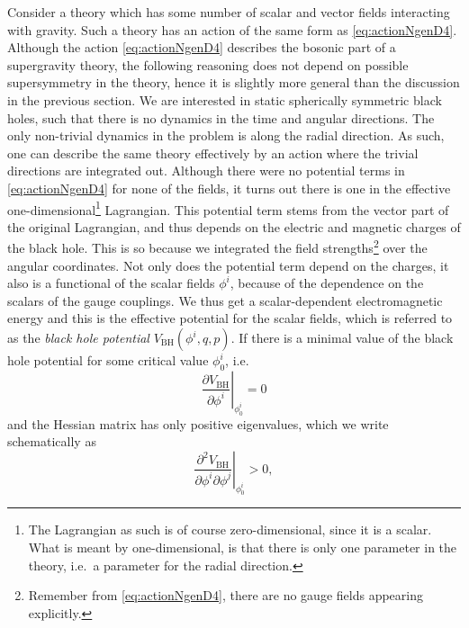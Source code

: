 \documentclass[12pt,twoside]{book}
\begin{document}
Consider a theory which has some number of scalar and vector fields interacting with gravity. Such a theory has an action of the same form as \eqref{eq:actionNgenD4}. Although the action \eqref{eq:actionNgenD4} describes the bosonic part of a supergravity theory, the following reasoning does not depend on possible supersymmetry in the theory, hence it is slightly more general than the discussion in the previous section. We are interested in static spherically symmetric black holes, such that there is no dynamics in the time and angular directions. The only non-trivial dynamics in the problem is along the radial direction. As such, one can describe the same theory effectively by an action where the trivial directions are integrated out. Although there were no potential terms in \eqref{eq:actionNgenD4} for none of the fields, it turns out there is one in the effective one-dimensional\footnote{The Lagrangian as such is of course zero-dimensional, since it is a scalar. What is meant by one-dimensional, is that there is only one parameter in the theory, i.e.\ a parameter for the radial direction.} Lagrangian. This potential term stems from the vector part of the original Lagrangian, and thus depends on the electric and magnetic charges of the black hole. This is so because we integrated the field strengths\footnote{Remember from \eqref{eq:actionNgenD4}, there are no gauge fields appearing explicitly.} over the angular coordinates. Not only does the potential term depend on the charges, it also is a functional of the scalar fields $\phi^{i}$, because of the dependence on the scalars of the gauge couplings. We thus get a scalar-dependent electromagnetic energy and this is the effective potential for the scalar fields, which is referred to as the \emph{black hole potential} $V_{\mathrm{BH}}(\phi^{i},q,p)$. If there is a minimal value of the black hole potential for some critical value $\phi^{i}_{0}$, i.e.\
\begin{equation}\label{extr-attr-cond1}
\left. \frac{\partial V_{\mathrm{BH}}}{\partial \phi^{i}} \right|_{\phi^{i}_{0}} = 0 
\end{equation}
and the Hessian matrix has only positive eigenvalues, which we write schematically as
\begin{equation}\label{extr-attr-cond2}
\left. \frac{\partial^{2} V_{\mathrm{BH}}}{\partial \phi^{i} \partial \phi^{j}} \right|_{\phi^{i}_{0}} > 0,
\end{equation}
\end{document}
